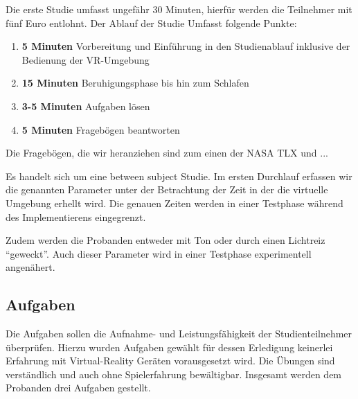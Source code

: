 Die erste Studie umfasst ungefähr 30 Minuten, hierfür werden die Teilnehmer mit fünf Euro entlohnt. Der Ablauf der Studie Umfasst folgende Punkte:

\begin{enumerate}
	\item \textbf{5 Minuten} Vorbereitung und Einführung in den Studienablauf inklusive der Bedienung der VR-Umgebung
	\item \textbf{15 Minuten} Beruhigungsphase bis hin zum Schlafen
	\item \textbf{3-5 Minuten} Aufgaben lösen
	\item \textbf{5 Minuten} Fragebögen beantworten
\end{enumerate}

Die Fragebögen, die wir heranziehen sind zum einen der NASA TLX und ... 

Es handelt sich um eine between subject Studie. Im ersten Durchlauf erfassen wir die genannten Parameter unter der Betrachtung der Zeit in der die virtuelle Umgebung erhellt wird. Die genauen Zeiten werden in einer Testphase während des Implementierens eingegrenzt.

Zudem werden die Probanden entweder mit Ton oder durch einen Lichtreiz "`geweckt"'. Auch dieser Parameter wird in einer Testphase experimentell angenähert.

\subsection{Aufgaben}
Die Aufgaben sollen die Aufnahme- und Leistungsfähigkeit der Studienteilnehmer überprüfen. Hierzu wurden Aufgaben gewählt für dessen Erledigung keinerlei Erfahrung mit Virtual-Reality Geräten vorausgesetzt wird. Die Übungen sind verständlich und auch ohne Spielerfahrung bewältigbar.
Insgesamt werden dem Probanden drei Aufgaben gestellt. 
 


